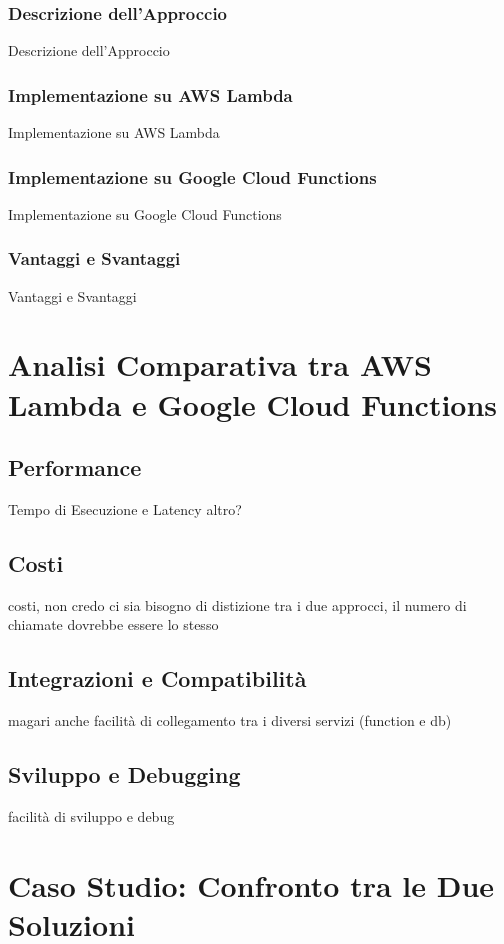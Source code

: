 \documentclass[12pt,a4paper,twoside]{book}
\begin{document}
\subsection{Descrizione dell’Approccio}
Descrizione dell’Approccio

\subsection{Implementazione su AWS Lambda}
Implementazione su AWS Lambda

\subsection{Implementazione su Google Cloud Functions}
Implementazione su Google Cloud Functions

\subsection{Vantaggi e Svantaggi}
Vantaggi e Svantaggi

\chapter{Analisi Comparativa tra AWS Lambda e Google Cloud Functions}
\section{Performance}
Tempo di Esecuzione e Latency
altro?

\section{Costi}
costi, non credo ci sia bisogno di distizione tra i due approcci, il numero di chiamate dovrebbe essere lo stesso

\section{Integrazioni e Compatibilità}
magari anche facilità di collegamento tra i diversi servizi (function e db)

\section{Sviluppo e Debugging}
facilità di sviluppo e debug

\chapter{Caso Studio: Confronto tra le Due Soluzioni}
\end{document}
